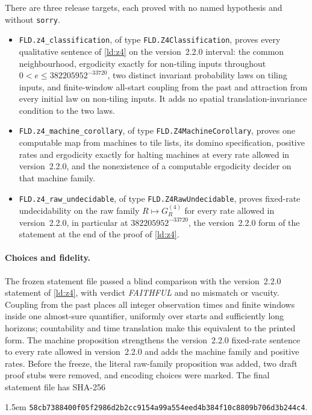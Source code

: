 There are three release targets, each proved with no named hypothesis and without \texttt{sorry}.
\begin{itemize}
\item \nolinkurl{FLD.z4_classification}, of type \nolinkurl{FLD.Z4Classification}, proves every qualitative sentence of \cref{ld:z4} on the version~2.2.0 interval: the common neighbourhood, ergodicity exactly for non-tiling inputs throughout $0<e\le382205952^{-33720}$, two distinct invariant probability laws on tiling inputs, and finite-window all-start coupling from the past and attraction from every initial law on non-tiling inputs. It adds no spatial translation-invariance condition to the two laws. 
\item \nolinkurl{FLD.z4_machine_corollary}, of type \nolinkurl{FLD.Z4MachineCorollary}, proves one computable map from machines to tile lists, its domino specification, positive rates and ergodicity exactly for halting machines at every rate allowed in version~2.2.0, and the nonexistence of a computable ergodicity decider on that machine family.
\item \nolinkurl{FLD.z4_raw_undecidable}, of type \nolinkurl{FLD.Z4RawUndecidable}, proves fixed-rate undecidability on the raw family $R\mapsto G_R^{(4)}$ for every rate allowed in version~2.2.0, in particular at $382205952^{-33720}$, the version~2.2.0 form of the statement at the end of the proof of \cref{ld:z4}.
\end{itemize}

\paragraph{Choices and fidelity.} The frozen statement file passed a blind comparison with the version~2.2.0 statement of \cref{ld:z4}, with verdict \emph{FAITHFUL} and no mismatch or vacuity. Coupling from the past places all integer observation times and finite windows inside one almost-sure quantifier, uniformly over starts and sufficiently long horizons; countability and time translation make this equivalent to the printed form. The machine proposition strengthens the version~2.2.0 fixed-rate sentence to every rate allowed in version~2.2.0 and adds the machine family and positive rates. Before the freeze, the literal raw-family proposition was added, two draft proof stubs were removed, and encoding choices were marked. The final statement file has SHA-256
\begin{flushleft}\small\leftskip1.5em
\nolinkurl{58cb7388400f05f2986d2b2cc9154a99a554eed4b384f10c8809b706d3b244c4}.
\end{flushleft}

